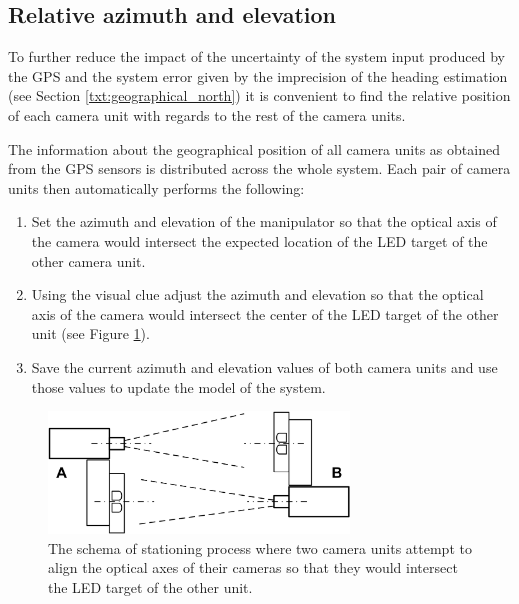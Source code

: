 \subsection{Relative azimuth and elevation}

To further reduce the impact of the uncertainty of the system input produced by the GPS and the system error given by the imprecision of the heading estimation (see Section \ref{txt:geographical_north}) it is convenient to find the relative position of each camera unit with regards to the rest of the camera units.

The information about the geographical position of all camera units as obtained from the GPS sensors is distributed across the whole system. Each pair of camera units then automatically performs the following:

\begin{enumerate}
	\item Set the azimuth and elevation of the manipulator so that the optical axis of the camera would intersect the expected location of the LED target of the other camera unit.
	\item Using the visual clue adjust the azimuth and elevation so that the optical axis of the camera would intersect the center of the LED target of the other unit (see Figure \ref{fig:stationing_aiming}).
	\item Save the current azimuth and elevation values of both camera units and use those values to update the model of the system.
\end{enumerate}

\begin{figure}[htb]
	\centering
	\includegraphics[width=8cm]{fig/stationing_aiming.png}
	\caption{The schema of stationing process where two camera units attempt to align the optical axes of their cameras so that they would intersect the LED target of the other unit.}
	\label{fig:stationing_aiming}
\end{figure}


